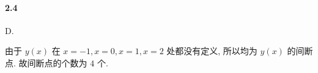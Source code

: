 \paragraph*{2.4} D.

由于 $y(x)$ 在 $x = -1, x = 0, x = 1, x = 2$ 处都没有定义, 所以均为 $y(x)$ 的间断点. 故间断点的个数为 $4$ 个.